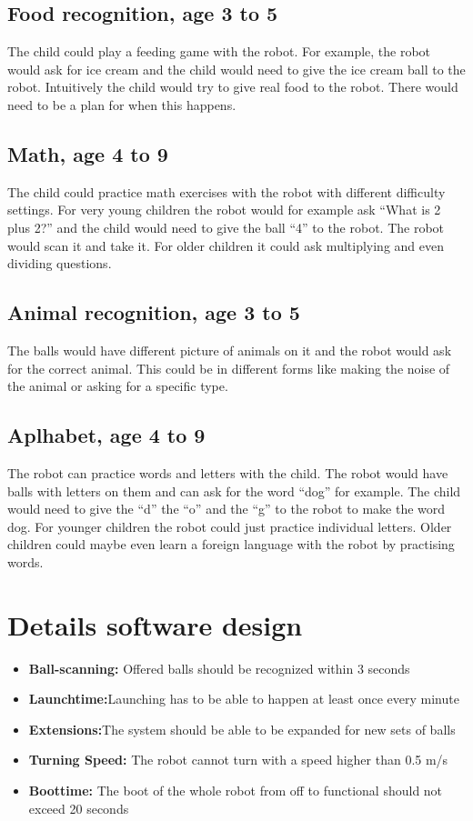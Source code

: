 \documentclass[11pt,twoside,a4paper]{report}
\begin{document}
\begin{appendices}
\section{Food recognition, age 3 to 5}
The child could play a feeding game with the robot. For example, the robot would ask for ice cream and the child would need to give the ice cream ball to the robot. Intuitively the child would try to give real food to the robot. There would need to be a plan for when this happens.
\section{Math, age 4 to 9}
The child could practice math exercises with the robot with different difficulty settings. For very young children the robot would for example ask “What is 2 plus 2?” and the child would need to give the ball “4” to the robot. The robot would scan it and take it. For older children it could ask multiplying and even dividing questions.
\section{Animal recognition, age 3 to 5}
The balls would have different picture of animals on it and the robot would ask for the correct animal. This could be in different forms like making the noise of the animal or asking for a specific type.
\section{Aplhabet, age 4 to 9}
The robot can practice words and letters with the child. The robot would have balls with letters on them and can ask for the word “dog” for example. The child would need to give the “d” the “o” and the “g” to the robot to make the word dog. For younger children the robot could just practice individual letters. Older children could maybe even learn a foreign language with the robot by practising words.
\label{appendix:games}

\chapter{Details software design}
\begin{itemize}
\item \textbf{Ball-scanning:} Offered balls should be recognized within 3 seconds
\item\textbf{Launchtime:}Launching has to be able to happen at least once every minute
\item\textbf{Extensions:}The system should be able to be expanded for new sets of balls
\item\textbf{Turning Speed:} The robot cannot turn with a speed higher than 0.5 m/s
\item\textbf{Boottime:} The boot of the whole robot from off to functional should not exceed 20 seconds
\end{itemize}
\label{appendix:software}


\end{appendices}
\end{document}
